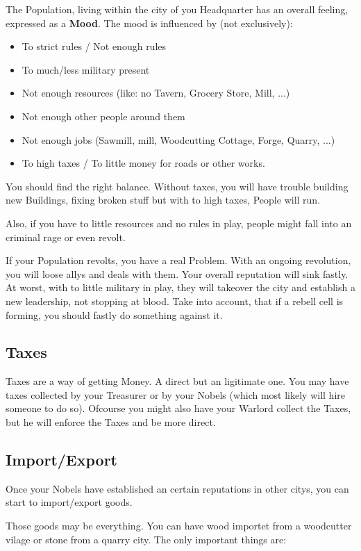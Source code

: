 \documentclass[10pt,twoside,twocolumn,openany]{book}
\begin{document}
The Population, living within the city of you Headquarter has an overall feeling, expressed as a \textbf{Mood}. The mood is influenced by (not exclusively):
\begin{itemize}
\item To strict rules / Not enough rules
\item To much/less military present
\item Not enough resources (like: no Tavern, Grocery Store, Mill, ...)
\item Not enough other people around them
\item Not enough jobs (Sawmill, mill, Woodcutting Cottage, Forge, Quarry, ...)
\item To high taxes / To little money for roads or other works.
\end{itemize}

You should find the right balance. Without taxes, you will have trouble building new Buildings, fixing broken stuff but with to high taxes, People will run.

Also, if you have to little resources and no rules in play, people might fall into an criminal rage or even revolt. 

If your Population revolts, you have a real Problem. With an ongoing revolution, you will loose allys and deals with them. Your overall reputation will sink fastly. At worst, with to little military in play, they will takeover the city and establish a new leadership, not stopping at blood. Take into account, that if a rebell cell is forming, you should fastly do something against it.

\subsection{Taxes}

Taxes are a way of getting Money. A direct but an ligitimate one. You may have taxes collected by your Treasurer or by your Nobels (which most likely will hire someone to do so). Ofcourse you might also have your Warlord collect the Taxes, but he will enforce the Taxes and be more direct.

\subsection{Import/Export}

Once your Nobels have established an certain reputations in other citys, you can start to import/export goods.

Those goods may be everything. You can have wood importet from a woodcutter vilage or stone from a quarry city. The only important things are:
\end{document}
